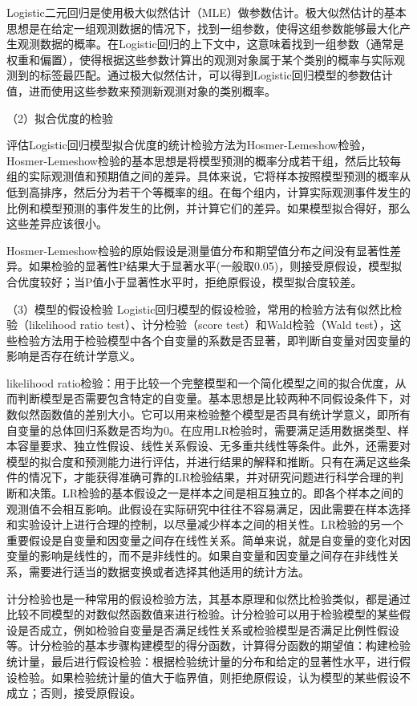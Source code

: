 Logistic二元回归是使用极大似然估计（MLE）做参数估计。极大似然估计的基本思想是在给定一组观测数据的情况下，找到一组参数，使得这组参数能够最大化产生观测数据的概率。在Logistic回归的上下文中，这意味着找到一组参数（通常是权重和偏置），使得根据这些参数计算出的观测对象属于某个类别的概率与实际观测到的标签最匹配。通过极大似然估计，可以得到Logistic回归模型的参数估计值，进而使用这些参数来预测新观测对象的类别概率。

（2）拟合优度的检验

评估Logistic回归模型拟合优度的统计检验方法为Hosmer-Lemeshow检验，Hosmer-Lemeshow检验的基本思想是将模型预测的概率分成若干组，然后比较每组的实际观测值和预期值之间的差异。具体来说，它将样本按照模型预测的概率从低到高排序，然后分为若干个等概率的组。在每个组内，计算实际观测事件发生的比例和模型预测的事件发生的比例，并计算它们的差异。如果模型拟合得好，那么这些差异应该很小。

Hosmer-Lemeshow检验的原始假设是测量值分布和期望值分布之间没有显著性差异。如果检验的显著性P结果大于显著水平(一般取0.05)，则接受原假设，模型拟合优度较好；当P值小于显著性水平时，拒绝原假设，模型拟合度较差。

（3）模型的假设检验
Logistic回归模型的假设检验，常用的检验方法有似然比检验（likelihood ratio test）、计分检验（score test）和Wald检验（Wald test），这些检验方法用于检验模型中各个自变量的系数是否显著，即判断自变量对因变量的影响是否存在统计学意义。

likelihood ratio检验：用于比较一个完整模型和一个简化模型之间的拟合优度，从而判断模型是否需要包含特定的自变量。基本思想是比较两种不同假设条件下，对数似然函数值的差别大小。它可以用来检验整个模型是否具有统计学意义，即所有自变量的总体回归系数是否均为0。在应用LR检验时，需要满足适用数据类型、样本容量要求、独立性假设、线性关系假设、无多重共线性等条件。此外，还需要对模型的拟合度和预测能力进行评估，并进行结果的解释和推断。只有在满足这些条件的情况下，才能获得准确可靠的LR检验结果，并对研究问题进行科学合理的判断和决策。LR检验的基本假设之一是样本之间是相互独立的。即各个样本之间的观测值不会相互影响。此假设在实际研究中往往不容易满足，因此需要在样本选择和实验设计上进行合理的控制，以尽量减少样本之间的相关性。LR检验的另一个重要假设是自变量和因变量之间存在线性关系。简单来说，就是自变量的变化对因变量的影响是线性的，而不是非线性的。如果自变量和因变量之间存在非线性关系，需要进行适当的数据变换或者选择其他适用的统计方法。

计分检验也是一种常用的假设检验方法，其基本原理和似然比检验类似，都是通过比较不同模型的对数似然函数值来进行检验。计分检验可以用于检验模型的某些假设是否成立，例如检验自变量是否满足线性关系或检验模型是否满足比例性假设等。计分检验的基本步骤构建模型的得分函数，计算得分函数的期望值：构建检验统计量，最后进行假设检验：根据检验统计量的分布和给定的显著性水平，进行假设检验。如果检验统计量的值大于临界值，则拒绝原假设，认为模型的某些假设不成立；否则，接受原假设。

